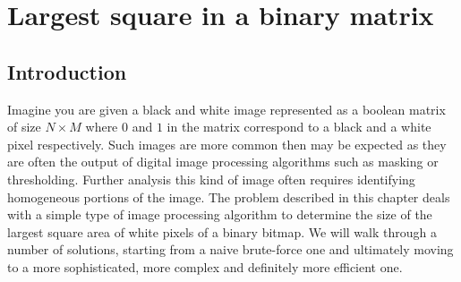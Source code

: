 %

\chapter{Largest square in a binary matrix}
\label{ch:square_in_matrix}
\section*{Introduction}
Imagine you are given a black and white image represented as a boolean matrix of size $N\times M$
where $0$ and $1$ in the matrix correspond to a black and a white pixel respectively. Such images are more common then may be expected as they are often the output of digital
image processing algorithms such as masking or thresholding. Further analysis this kind of image
often requires identifying homogeneous portions of the image. The problem described in this chapter
deals with a simple type of image processing algorithm to determine the size of the
largest square area of white pixels of a binary bitmap. We will walk through a number of solutions,
starting from a naive brute-force one and ultimately moving to a more sophisticated, more complex and definitely more
efficient one.
 

